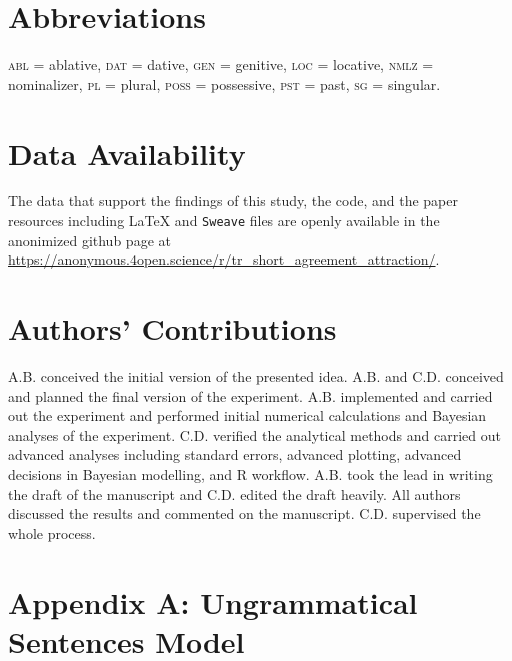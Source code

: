 \documentclass[brill,linguex]{glossa}\usepackage[]{graphicx}\usepackage[]{color}
\begin{document}
  
\section*{Abbreviations} %


\textsc{abl} = ablative, \textsc{dat} = dative, \textsc{gen} = genitive, \textsc{loc} = locative, \textsc{nmlz} = nominalizer, \textsc{pl} = plural, \textsc{poss} = possessive, \textsc{pst} = past, \textsc{sg} = singular. %



\section*{Data Availability} %


The data that support the findings of this study, the code, and the paper resources including \LaTeX{} and \texttt{Sweave} files are openly available in the anonimized github page at \url{https://anonymous.4open.science/r/tr_short_agreement_attraction/}. %


\section*{Authors' Contributions} %


A.B. conceived the initial version of the presented idea. A.B. and C.D. conceived and planned the final version of the experiment. A.B. implemented and carried out the experiment and performed initial numerical calculations and Bayesian analyses of the experiment. C.D. verified the analytical methods and carried out advanced analyses including \citet{Cousineau:2007} standard errors, advanced plotting, advanced decisions in Bayesian modelling, and R workflow. A.B. took the lead in writing the draft of the manuscript and C.D. edited the draft heavily. All authors discussed the results and commented on the manuscript. C.D. supervised the whole process. %




\section*{Appendix A: Ungrammatical Sentences Model}
\end{document}
